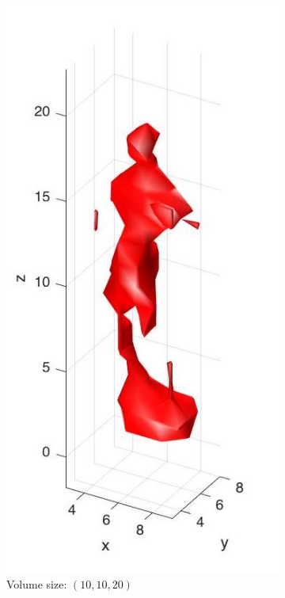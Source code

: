 \documentclass{ethz_report}
\begin{document}
\begin{figure}[H]
\centering
\begin{subfigure}[b]{.5\textwidth}
  \centering
  \includegraphics[width=.7\linewidth]{images/visual_hull_low}
  \caption{Volume size: $(10, 10, 20)$}
\end{subfigure}%
\begin{subfigure}[b]{.5\textwidth}
  \centering

\end{subfigure}
\end{figure}
\end{document}
